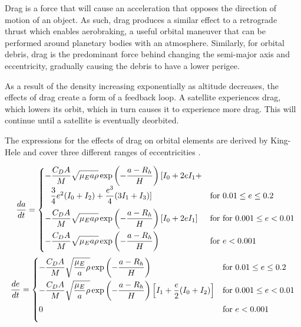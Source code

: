 \documentclass[a4paper, 12pt]{article}
\begin{document}
Drag is a force that will cause an acceleration that opposes the direction of motion of an object. As such, drag produces a similar effect to a retrograde thrust which enables aerobraking, a useful orbital maneuver that can be performed around planetary bodies with an atmosphere. Similarly, for orbital debris, drag is the predominant force behind changing the semi-major axis and eccentricity, gradually causing the debris to have a lower perigee.

As a result of the density increasing exponentially as altitude decreases, the effects of drag create a form of a feedback loop. A satellite experiences drag, which lowers its orbit, which in turn causes it to experience more drag. This will continue until a satellite is eventually deorbited. 

The expressions for the effects of drag on orbital elements are derived by King-Hele and cover three different ranges of eccentricities \citep{KINGHELE1987269}.

\begin{align}
		\dfrac{da}{dt} = \begin{cases}
			-\dfrac{C_D A}{M} \sqrt{\mathstrut\mu_E a \rho} \exp\left(-\dfrac{a - R_h}{H}\right)[I_0 
			+ 2eI_1 + \\ \:\:\:\dfrac{3}{4}e^2(I_0 + I_2) + \dfrac{e^3}{4}(3I_1 +I_3)] & \text{for } 0.01 \leq e \leq 0.2 \\[2ex]
			-\dfrac{C_D A}{M} \sqrt{\mathstrut\mu_E a \rho}\exp\left(-\dfrac{a - R_h}{H}\right)\left[I_0 + 2eI_1 \right] & \text{for } \text{for } 0.001 \leq e < 0.01\\[2ex]
			-\dfrac{C_D A}{M} \sqrt{\mathstrut\mu_E a \rho}\exp\left(-\dfrac{a - R_h}{H}\right) & \text{for } e < 0.001\\[2ex]
		\end{cases}\\
		\newline
		\dfrac{de}{dt} = \begin{cases}
			-\dfrac{C_D A}{M} \sqrt{\mathstrut\dfrac{\mu_E}{a} \rho}\exp\left(-\dfrac{a - R_h}{H}\right) & \text{for } 0.01 \leq e \leq 0.2  \\[2ex]
			-\dfrac{C_D A}{M} \sqrt{\mathstrut\dfrac{\mu_E}{a} \rho}\exp\left(-\dfrac{a - R_h}{H}\right)\left[I_1 + \dfrac{e}{2}(I_0 + I_2)\right] & \text{for } 0.001 \leq e < 0.01\\[2ex]
			0 & \text{for } e < 0.001\\[2ex]
		\end{cases}
	\end{align}
\end{document}
